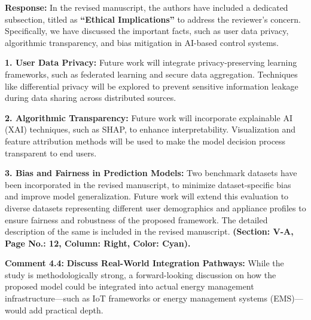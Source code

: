 \documentclass[12pt]{article}
\begin{document}
\hspace{-1.5em}\textbf{Response:}
In the revised manuscript, the authors have included a dedicated subsection, 
titled as \textbf{“Ethical Implications”} to address the reviewer’s concern. Specifically, we have discussed the important facts, such as user data privacy, algorithmic transparency, and bias mitigation in AI-based control systems.
\vspace{0.15cm}

\textbf{1. User Data Privacy:} Future work will integrate privacy-preserving learning frameworks, such as federated learning and secure data aggregation. Techniques like differential privacy will be explored to prevent sensitive information leakage during data sharing across distributed sources.
\vspace{0.15cm}

\textbf{2. Algorithmic Transparency:} Future work will incorporate explainable AI (XAI) techniques, such as SHAP, to enhance interpretability. Visualization and feature attribution methods will be used to make the model decision process transparent to end users.
\vspace{0.15cm}

\textbf{3. Bias and Fairness in Prediction Models:} Two benchmark datasets have been incorporated in the revised manuscript, to  minimize dataset-specific bias and improve model generalization. Future work will extend this evaluation to diverse datasets representing different user demographics and appliance profiles to ensure fairness and robustness of the proposed framework.\newline
The detailed description of the same is included in the revised manuscript. \textbf{(Section: V-A, Page No.: 12, Column: Right, Color: Cyan).}
\newline

\noindent\textbf{Comment 4.4:} \textbf{Discuss Real-World Integration Pathways:} While the study is methodologically strong, a forward-looking discussion on how the proposed model could be integrated into actual energy management infrastructure—such as IoT frameworks or energy management systems (EMS)—would add practical depth.
\vspace{0.15cm}
\end{document}
